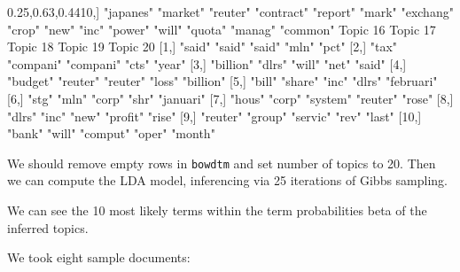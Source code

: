 \documentclass[
]{article}
\newenvironment{Shaded}{}{}
\newcommand{\DecValTok}[1]{\textcolor[rgb]{0.25,0.63,0.44}{#1}}
\newcommand{\NormalTok}[1]{#1}
\newcommand{\StringTok}[1]{\textcolor[rgb]{0.25,0.44,0.63}{#1}}
\begin{document}
\begin{Shaded}
\begin{Highlighting}[]
\NormalTok{[}\DecValTok{10}\NormalTok{,] }\StringTok{"japanes"} \StringTok{"market"}  \StringTok{"reuter"}  \StringTok{"contract"} \StringTok{"report"}  \StringTok{"mark"}    \StringTok{"exchang"} \StringTok{"crop"}       \StringTok{"new"}      \StringTok{"inc"}     \StringTok{"power"}   \StringTok{"will"}    \StringTok{"quota"}   \StringTok{"manag"}  \StringTok{"common"} 
\NormalTok{      Topic }\DecValTok{16}\NormalTok{  Topic }\DecValTok{17}\NormalTok{  Topic }\DecValTok{18}\NormalTok{  Topic }\DecValTok{19}\NormalTok{ Topic }\DecValTok{20}  
\NormalTok{ [}\DecValTok{1}\NormalTok{,] }\StringTok{"said"}    \StringTok{"said"}    \StringTok{"said"}    \StringTok{"mln"}    \StringTok{"pct"}     
\NormalTok{ [}\DecValTok{2}\NormalTok{,] }\StringTok{"tax"}     \StringTok{"compani"} \StringTok{"compani"} \StringTok{"cts"}    \StringTok{"year"}    
\NormalTok{ [}\DecValTok{3}\NormalTok{,] }\StringTok{"billion"} \StringTok{"dlrs"}    \StringTok{"will"}    \StringTok{"net"}    \StringTok{"said"}    
\NormalTok{ [}\DecValTok{4}\NormalTok{,] }\StringTok{"budget"}  \StringTok{"reuter"}  \StringTok{"reuter"}  \StringTok{"loss"}   \StringTok{"billion"} 
\NormalTok{ [}\DecValTok{5}\NormalTok{,] }\StringTok{"bill"}    \StringTok{"share"}   \StringTok{"inc"}     \StringTok{"dlrs"}   \StringTok{"februari"}
\NormalTok{ [}\DecValTok{6}\NormalTok{,] }\StringTok{"stg"}     \StringTok{"mln"}     \StringTok{"corp"}    \StringTok{"shr"}    \StringTok{"januari"} 
\NormalTok{ [}\DecValTok{7}\NormalTok{,] }\StringTok{"hous"}    \StringTok{"corp"}    \StringTok{"system"}  \StringTok{"reuter"} \StringTok{"rose"}    
\NormalTok{ [}\DecValTok{8}\NormalTok{,] }\StringTok{"dlrs"}    \StringTok{"inc"}     \StringTok{"new"}     \StringTok{"profit"} \StringTok{"rise"}    
\NormalTok{ [}\DecValTok{9}\NormalTok{,] }\StringTok{"reuter"}  \StringTok{"group"}   \StringTok{"servic"}  \StringTok{"rev"}    \StringTok{"last"}    
\NormalTok{[}\DecValTok{10}\NormalTok{,] }\StringTok{"bank"}    \StringTok{"will"}    \StringTok{"comput"}  \StringTok{"oper"}   \StringTok{"month"}  
\end{Highlighting}
\end{Shaded}

We should remove empty rows in \texttt{bowdtm} and set number of topics
to 20. Then we can compute the LDA model, inferencing via 25 iterations
of Gibbs sampling.

We can see the 10 most likely terms within the term probabilities beta
of the inferred topics.

We took eight sample documents:
\end{document}
